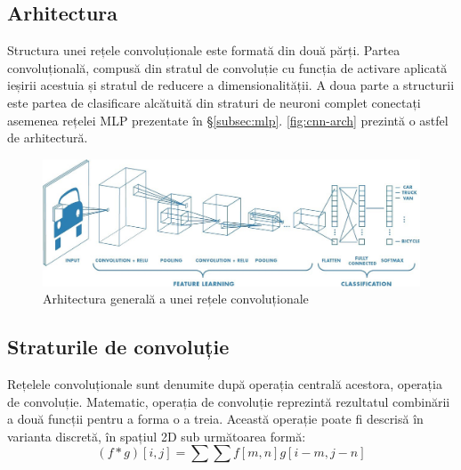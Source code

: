 \subsection*{Arhitectura}
Structura unei rețele convoluționale este formată din două părți.
Partea convoluțională, compusă din stratul de convoluție cu funcția de activare aplicată ieșirii acestuia și stratul de reducere a dimensionalității. A doua parte a structurii este partea de clasificare alcătuită din straturi de neuroni complet conectați asemenea rețelei MLP prezentate în \S\ref{subsec:mlp}. \autoref{fig:cnn-arch} prezintă o astfel de arhitectură.
\begin{figure}[ht]
\centering
\includegraphics[width=\textwidth]{fig/cap2/cnn-arch.jpeg}
\caption{Arhitectura generală a unei rețele convoluționale \cite{online:cnn-arch}}
\label{fig:cnn-arch}
\end{figure}

\subsection*{Straturile de convoluție}
Rețelele convoluționale sunt denumite după operația centrală acestora, operația de convoluție. Matematic, operația de convoluție reprezintă rezultatul combinării a două funcții pentru a forma o a treia. Această operație poate fi descrisă în varianta discretă, în spațiul 2D sub următoarea formă:
\begin{equation}
(f*g)[i,j]=\sum\sum f[m,n]g[i-m,j-n]
\label{eq:conv-dis-2D}
\end{equation}

